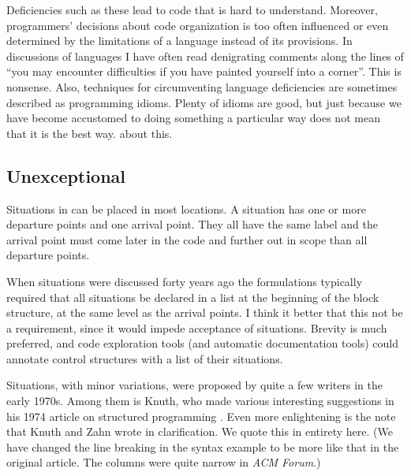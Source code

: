 \documentclass[10pt]{amsart}
\begin{document}
Deficiencies such as these lead to code that is hard to understand.
Moreover, programmers' decisions about code organization is too often
influenced or even determined by the limitations of a language instead
of its provisions.  In discussions of languages I have often read
denigrating comments along the lines of ``you may encounter
difficulties if you have painted yourself into a corner''.  This is
nonsense.  Also, techniques for circumventing language deficiencies
are sometimes described as programming idioms.  Plenty of idioms are
good, but just because we have become accustomed to doing something a
particular way does not mean that it is the best way.  about this.


\subsection{Unexceptional}

Situations in \Utop can be placed in most locations.  A situation has
one or more departure points and one arrival point.  They all have the
same label and the arrival point must come later in the code and
further out in scope than all departure points.

When situations were discussed forty years ago the formulations
typically required that all situations be declared in a list at the
beginning of the block structure, at the same level as the arrival
points.  I think it better that this not be a requirement, since it
would impede acceptance of situations.  Brevity is much preferred, and
code exploration tools (and automatic documentation tools) could
annotate control structures with a list of their situations.

Situations, with minor variations, were proposed by quite a few
writers in the early 1970s.  Among them is Knuth, who made various
interesting suggestions in his 1974 article on structured programming
\cite{KnuthDE74}.  Even more enlightening is the note \cite{KnuthDE75}
that Knuth and Zahn wrote in clarification.  We quote this in entirety
here.  (We have changed the line breaking in the syntax example to be
more like that in the original article.  The columns were quite narrow
in \emph{ACM Forum}.)
\end{document}
